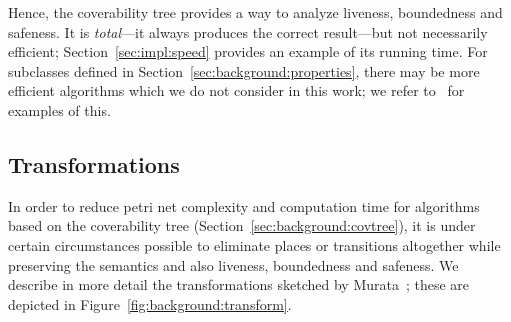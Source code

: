 Hence, the coverability tree provides a way to analyze liveness, boundedness and safeness. It is \emph{total}---it always produces the correct result---but not necessarily efficient; Section~\ref{sec:impl:speed} provides an example of its running time. For subclasses defined in Section~\ref{sec:background:properties}, there may be more efficient algorithms which we do not consider in this work; we refer to~\cite{murata1989petri,desel2005free} for examples of this.

\subsection{Transformations}\label{sec:background:transformations}

In order to reduce petri net complexity and computation time for algorithms based on the coverability tree (Section~\ref{sec:background:covtree}), it is under certain circumstances possible to eliminate places or transitions altogether while preserving the semantics and also liveness, boundedness and safeness. We describe in more detail the transformations sketched by Murata~\cite{murata1989petri}; these are depicted in Figure~\ref{fig:background:transform}.

